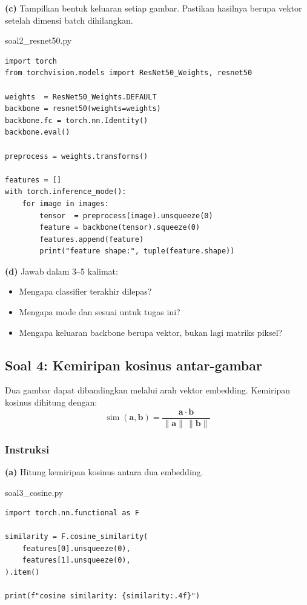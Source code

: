 \documentclass[12pt, a4paper]{article}
\begin{document}
\textbf{(c)} Tampilkan bentuk keluaran setiap gambar. Pastikan hasilnya berupa vektor  setelah dimensi batch dihilangkan.

\begin{codewindow}{soal2\_resnet50.py}
\begin{lstlisting}[style=pycode]
import torch
from torchvision.models import ResNet50_Weights, resnet50

weights  = ResNet50_Weights.DEFAULT
backbone = resnet50(weights=weights)
backbone.fc = torch.nn.Identity()
backbone.eval()

preprocess = weights.transforms()

features = []
with torch.inference_mode():
    for image in images:
        tensor  = preprocess(image).unsqueeze(0)
        feature = backbone(tensor).squeeze(0)
        features.append(feature)
        print("feature shape:", tuple(feature.shape))
\end{lstlisting}
\end{codewindow}

\textbf{(d)} Jawab dalam 3--5 kalimat:
\begin{itemize}
  \item Mengapa classifier terakhir dilepas?
  \item Mengapa mode  dan  sesuai untuk tugas ini?
  \item Mengapa keluaran backbone berupa vektor, bukan lagi matriks piksel?
\end{itemize}

\subsection{Soal 4: Kemiripan kosinus antar-gambar}
\label{sec:soal3-kosinus}

Dua gambar dapat dibandingkan melalui arah vektor embedding. Kemiripan kosinus dihitung dengan:
\[
\operatorname{sim}(\mathbf{a}, \mathbf{b}) =
\frac{\mathbf{a} \cdot \mathbf{b}}
{\lVert\mathbf{a}\rVert\,\lVert\mathbf{b}\rVert}
\]

\subsubsection{Instruksi}
\label{sec:soal3-instruksi}

\textbf{(a)} Hitung kemiripan kosinus antara dua embedding.

\begin{codewindow}{soal3\_cosine.py}
\begin{lstlisting}[style=pycode]
import torch.nn.functional as F

similarity = F.cosine_similarity(
    features[0].unsqueeze(0),
    features[1].unsqueeze(0),
).item()

print(f"cosine similarity: {similarity:.4f}")
\end{lstlisting}
\end{codewindow}
\end{document}
